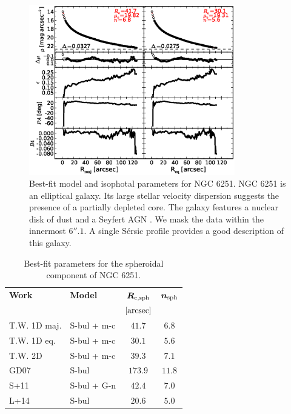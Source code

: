 \documentclass[preprint2]{emulateapj}
\newcommand{\fitfigurewidth}{0.8\textwidth}
\begin{document}
  \begin{figure}[h]
  \begin{center}
  \includegraphics[width=\fitfigurewidth]{images/n6251_1Dfit.eps}
  \caption{Best-fit model and isophotal parameters for NGC 6251.
  NGC 6251 is an elliptical galaxy. Its large stellar velocity dispersion suggests the presence of a partially depleted core.
  The galaxy features a nuclear disk of dust \citep{ferrareseford1999n6251} and a Seyfert AGN \citep{panessabassani2002}.
  We mask the data within the innermost $6''.1$. 
  A single S\'ersic profile provides a good description of this galaxy.
  }
  \end{center}
  \end{figure}

  \begin{table}[h]
  \small
  \caption{Best-fit parameters for the spheroidal component of NGC 6251.}
  \begin{center}
  \begin{tabular}{llcc}
  \hline
  {\bf Work} & {\bf Model}   & $\bm R_{\rm e,sph}$    & $\bm n_{\rm sph}$ \\
    &  &  $[\rm arcsec]$ & \\
  \hline
  T.W. 1D maj. & S-bul + m-c & $41.7$  &  $6.8$ \\
  T.W. 1D eq.  & S-bul + m-c & $30.1$  &  $5.6$ \\
  T.W. 2D      & S-bul + m-c & $39.3$  &  $7.1$ \\
  \hline
  GD07      & S-bul	     & $173.9$  &  $11.8$ \\
  S+11      & S-bul + G-n    & $42.4$	&  $7.0$ \\
  L+14      & S-bul	     & $20.6$	&  $5.0$ \\
  \hline
  \end{tabular}
  \end{center}
  \label{tab:n6251}
  \end{table}
\end{document}
